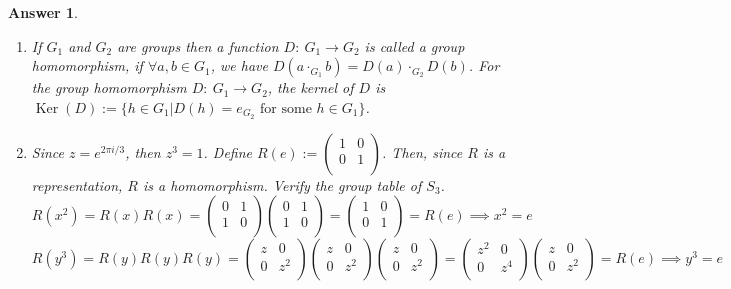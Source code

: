 \documentclass[a4paper]{article}
\DeclareMathOperator{\Ker}{Ker}
\newtheorem{ans}{Answer}[section]
\theoremstyle{new}
\begin{document}
\begin{ans}\leavevmode
\begin{enumerate}[label=(\roman*)]
\item If $G_1$ and $G_2$ are groups then a function $D:~ G_1\rightarrow G_2$ is called a group homomorphism, if $\forall a,b\in G_1$, we have $D(a\cdot_{G_1} b)=D(a)\cdot_{G_2}D(b)$. For the group homomorphism $D:~G_1\rightarrow G_2$, the kernel of $D$ is $\Ker(D):=\{h\in G_1|D(h)=e_{G_2}\text{  for some } h\in G_1\}$.
\item Since $z=e^{2\pi i/3}$, then $z^3=1$. Define $R(e):=\begin{pmatrix}1&0\\0&1\\\end{pmatrix}$. Then, since $R$ is a representation, $R$ is a homomorphism. Verify the group table of $S_3$.
$$R(x^2)=R(x)R(x)=\begin{pmatrix}0&1\\1&0\\\end{pmatrix}\begin{pmatrix}0&1\\1&0\\\end{pmatrix}=\begin{pmatrix}1&0\\0&1\\\end{pmatrix}=R(e)\implies x^2=e$$
$$R(y^3)=R(y)R(y)R(y)=\begin{pmatrix}z&0\\0&z^2\\\end{pmatrix}\begin{pmatrix}z&0\\0&z^2\\\end{pmatrix}\begin{pmatrix}z&0\\0&z^2\\\end{pmatrix}=\begin{pmatrix}z^2&0\\0&z^4\\\end{pmatrix}\begin{pmatrix}z&0\\0&z^2\\\end{pmatrix}=R(e)\implies y^3=e$$

\end{enumerate}
\end{ans}
\end{document}
